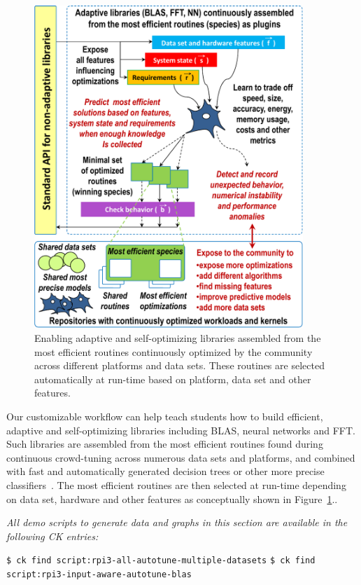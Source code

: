    \begin{figure}[!htbp]
     \centering
      \includegraphics[width=4in]
      {ck-assets/c6d665f41a28e209-cropped.pdf} %
     \caption{
      Enabling adaptive and self-optimizing libraries assembled from the most efficient routines
      continuously optimized by the community across different platforms and data sets. 
      These routines are selected automatically at run-time based on platform, data set and other features.
     }
     \label{fig:ck-adaptive-systems}
   \end{figure}

Our customizable workflow can help teach students how to build efficient,
adaptive and self-optimizing libraries including BLAS, neural networks and FFT.
%
Such libraries are assembled from the most efficient routines
found during continuous crowd-tuning across numerous data sets and platforms,
and combined with fast and automatically generated decision trees  
or other more precise classifiers~\cite{DBLP:journals/ijhpca/PuschelMSXJPVJ04,5160988,LCWP2009,cm:29db2248aba45e59:cd11e3a188574d80}.
%
The most efficient routines are then selected at run-time 
depending on data set, hardware and other features as conceptually shown
in Figure~\ref{fig:ck-adaptive-systems}..

\textit{All demo scripts to generate data and graphs in this section are available in the following CK entries:}
\begin{flushleft}
\texttt{\$ ck find script:rpi3-all-autotune-multiple-datasets}\newline
\texttt{\$ ck find script:rpi3-input-aware-autotune-blas}\newline
\end{flushleft}
